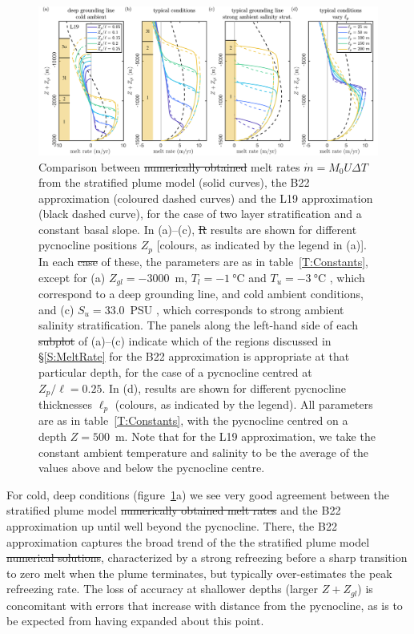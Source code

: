 \documentclass[openacc]{rsproca_new}%
\newcommand{\red}[1]{{\color{red} #1}}
\newcommand{\blue}[1]{{\color{blue} #1}}
\newcommand{\rout}[1]{\red{\st{#1}}}\newcommand{\ab}[1]{\textcolor{Green}{#1}}\newcommand{\about}[1]{\textcolor{Cyan}{\sout{#1}}}
\begin{document}
\begin{figure}
\centering
\includegraphics[width = \textwidth]{./make_plots/plots/figure7.pdf}
\caption{Comparison between \rout{numerically obtained }melt rates $\dot{m}= M_0 U \Delta T$ \blue{from the stratified plume model} (solid curves), the B22 approximation (coloured dashed curves) and the L19 approximation (black dashed curve), for the case of two layer stratification and a constant basal slope. \blue{In (a)--(c),} \rout{R}\blue{r}esults are shown for different pycnocline positions $Z_p$ [colours, as indicated by the legend in (a)]. In each \rout{case}\blue{of these}, the parameters are as in table~\ref{T:Constants}, except for (a) $Z_{gl} = -3000$~m, $T_l = -1~\si{\celsius}$ and $T_u = -3~\si{\celsius}$\blue{, which correspond to a deep grounding line, and cold ambient conditions,} and (c)  $S_u = 33.0$~PSU\blue{, which corresponds to strong ambient salinity stratification}.  The panels along the left-hand side of each \rout{subplot}\blue{of (a)--(c)} indicate which of the regions discussed in \S\ref{S:MeltRate} for the B22 approximation is appropriate at that particular depth, for the case of a pycnocline centred at $Z_p/\ell = 0.25$. \blue{In (d), results are shown for different pycnocline thicknesses $\ell_p$ (colours, as indicated by the legend). All parameters are as in table~\ref{T:Constants}, with the pycnocline centred on a depth $Z = 500$~m.} Note that for the L19 approximation, we take the constant ambient temperature and salinity to be the average of the values above and below the pycnocline \blue{centre}.}\label{fig:Numerics:PycnoclinePosition}
\end{figure}

For cold, deep conditions (figure~\ref{fig:Numerics:PycnoclinePosition}a) we see very good agreement between \blue{the stratified plume model}\rout{numerically obtained melt rates} and the B22 approximation up until well beyond the pycnocline. There, the B22 approximation captures the broad trend of the \blue{the stratified plume model}\rout{numerical solutions}, characterized by a strong refreezing before a sharp transition to zero melt when the plume terminates, but typically over-estimates the peak refreezing rate. The loss of accuracy at shallower depths (larger $Z + Z_{gl}$) is concomitant with errors that increase with distance from the pycnocline, as is to be expected from having expanded about this point.
\end{document}
